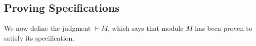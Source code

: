 {{%
%
%
%



\subsection{Proving \SpecLang Specifications}
\label{sect:wf}

We now define the judgment $\vdash M$, which says that module $M$ has been proven to satisfy its specification.

}}
